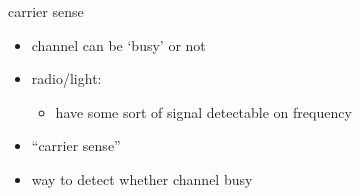 \begin{frame}{carrier sense}
    \begin{itemize}
    \item channel can be `busy' or not
    \item radio/light:
        \begin{itemize}
        \item have some sort of signal detectable on frequency
        \end{itemize}
    \vspace{.5cm}
    \item ``carrier sense''
    \item way to detect whether channel busy
    \end{itemize}
\end{frame}

